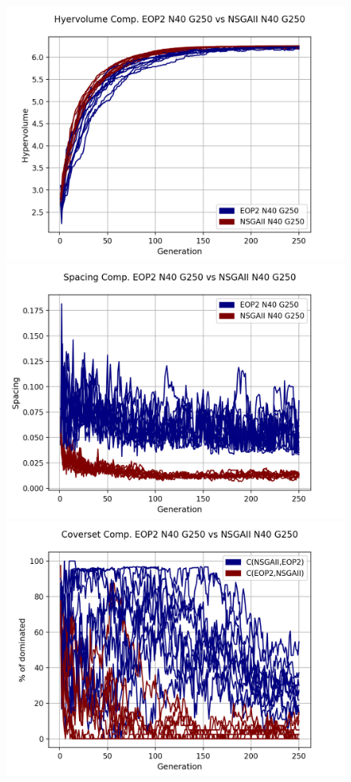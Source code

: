 \begin{figure}[H]
\centering
\includegraphics[scale=0.35]{../METRICS_PLOTS/Hypervol_COMP_EOP2N40G250_NSGAIIN40G250.png}
\includegraphics[scale=0.35]{../METRICS_PLOTS/Spacing_COMP_EOP2N40G250_NSGAIIN40G250.png}
\includegraphics[scale=0.35]{../METRICS_PLOTS/CoverSet_COMP_EOP2N40G250_NSGAIIN40G250.png}\\

\end{figure}
